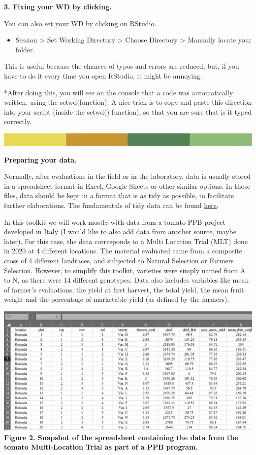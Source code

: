 \documentclass[
]{book}
\providecommand{\tightlist}{%
  \setlength{\itemsep}{0pt}\setlength{\parskip}{0pt}}
\begin{document}
\textbf{3. Fixing your WD by clicking. }

You can also set your WD by clicking on RStudio.

\begin{itemize}
\tightlist
\item
  Session \textgreater{} Set Working Directory \textgreater{} Choose Directory \textgreater{} Manually locate your folder.
\end{itemize}

This is useful because the chances of typos and errors are reduced, but, if you have to do it every time you open RStudio, it might be annoying.

*After doing this, you will see on the console that a code was automatically written, using the setwd(function). A nice trick is to copy and paste this direction into your script (inside the setwd() function), so that you are sure that is it typed correctly.

\includegraphics{rsrstrip.png}

\textbf{Preparing your data.}

Normally, after evaluations in the field or in the laboratory, data is usually stored in a spreadsheet format in Excel, Google Sheets or other similar options. In those files, data should be kept in a format that is as tidy as possible, to facilitate further elaborations. The fundamentals of tidy data can be found \href{https://cran.r-project.org/web/packages/tidyr/vignettes/tidy-data.html}{here}.

In this toolkit we will work mostly with data from a tomato PPB project developed in Italy (I would like to also add data from another source, maybe later). For this case, the data corresponds to a Multi Location Trial (MLT) done in 2020 at 4 different locations. The material evaluated came from a composite cross of 4 different landraces, and subjected to Natural Selection or Farmers Selection. However, to simplify this toolkit, varieties were simply named from A to N, as there were 14 different genotypes. Data also includes variables like mean of farmer's evaluations, the yield at first harvest, the total yield, the mean fruit weight and the percentage of marketable yield (as defined by the farmers).

\includegraphics{tomatodata.png}
\textbf{Figure 2. Snapshot of the spreadsheet containing the data from the tomato Multi-Location Trial as part of a PPB program. }
\end{document}

